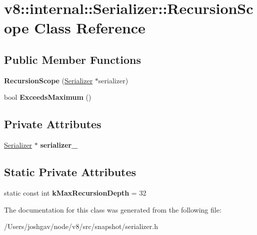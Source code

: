 \hypertarget{classv8_1_1internal_1_1_serializer_1_1_recursion_scope}{}\section{v8\+:\+:internal\+:\+:Serializer\+:\+:Recursion\+Scope Class Reference}
\label{classv8_1_1internal_1_1_serializer_1_1_recursion_scope}
\subsection*{Public Member Functions}
\begin{DoxyCompactItemize}
\item 
{\bfseries Recursion\+Scope} (\hyperlink{classv8_1_1internal_1_1_serializer}{Serializer} $\ast$serializer)\hypertarget{classv8_1_1internal_1_1_serializer_1_1_recursion_scope_ac378dfab36cf5a01f850940e8cd6ffc6}{}\label{classv8_1_1internal_1_1_serializer_1_1_recursion_scope_ac378dfab36cf5a01f850940e8cd6ffc6}

\item 
bool {\bfseries Exceeds\+Maximum} ()\hypertarget{classv8_1_1internal_1_1_serializer_1_1_recursion_scope_ae0fe43f43354131651b5048c644c5d24}{}\label{classv8_1_1internal_1_1_serializer_1_1_recursion_scope_ae0fe43f43354131651b5048c644c5d24}

\end{DoxyCompactItemize}
\subsection*{Private Attributes}
\begin{DoxyCompactItemize}
\item 
\hyperlink{classv8_1_1internal_1_1_serializer}{Serializer} $\ast$ {\bfseries serializer\+\_\+}\hypertarget{classv8_1_1internal_1_1_serializer_1_1_recursion_scope_a978efefca51c0a91a6eab3202087de58}{}\label{classv8_1_1internal_1_1_serializer_1_1_recursion_scope_a978efefca51c0a91a6eab3202087de58}

\end{DoxyCompactItemize}
\subsection*{Static Private Attributes}
\begin{DoxyCompactItemize}
\item 
static const int {\bfseries k\+Max\+Recursion\+Depth} = 32\hypertarget{classv8_1_1internal_1_1_serializer_1_1_recursion_scope_af26c8e21919bf5fd003337b9c6f51444}{}\label{classv8_1_1internal_1_1_serializer_1_1_recursion_scope_af26c8e21919bf5fd003337b9c6f51444}

\end{DoxyCompactItemize}


The documentation for this class was generated from the following file\+:\begin{DoxyCompactItemize}
\item 
/\+Users/joshgav/node/v8/src/snapshot/serializer.\+h\end{DoxyCompactItemize}
